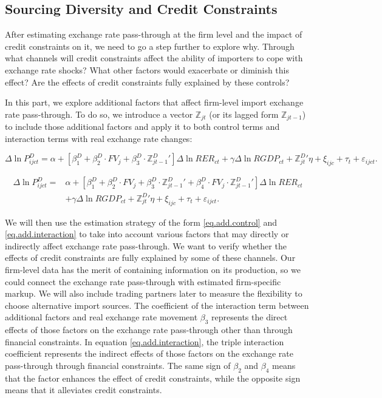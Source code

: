 \documentclass[12pt]{article}
\begin{document}
\subsection{Sourcing Diversity and Credit Constraints}

After estimating exchange rate pass-through at the firm level and the impact of credit constraints on it, we need to go a step further to explore why. Through what channels will credit constraints affect the ability of importers to cope with exchange rate shocks? What other factors would exacerbate or diminish this effect? Are the effects of credit constraints fully explained by these controls?

In this part, we explore additional factors that affect firm-level import exchange rate pass-through. To do so, we introduce a vector $\mathbb{Z}_{jt}$ (or its lagged form $\mathbb{Z}_{jt-1}$) to include those additional factors and apply it to both control terms and interaction terms with real exchange rate changes: 

\begin{equation}
	\Delta \ln P^{D}_{ijct}=\alpha+[\beta^D_{1}+ \beta^D_{2} \cdot FV_{j}+\beta^D_{3} \cdot {\mathbb{Z}^{D}_{jt-1}}'] \Delta \ln RER_{ct} +\gamma \Delta \ln RGDP_{ct}+ {\mathbb{Z}^{D}_{jt}}' \eta+\xi_{ijc}+\tau_{t} +\varepsilon_{ijct}.
	\label{eq.add.control}
\end{equation}

\begin{equation}
	\begin{aligned}
	\Delta \ln P^{D}_{ijct}=&\alpha+[\beta^D_{1}+ \beta^D_{2} \cdot FV_{j}+\beta^D_{3} \cdot {\mathbb{Z}^{D}_{jt-1}}'+\beta^D_{4} \cdot FV_{j} \cdot {\mathbb{Z}^{D}_{jt-1}}'] \Delta \ln RER_{ct} \\ &+\gamma \Delta \ln RGDP_{ct}+ {\mathbb{Z}^{D}_{jt}}' \eta+\xi_{ijc}+\tau_{t} +\varepsilon_{ijct}.
	\end{aligned}	
	\label{eq.add.interaction}
\end{equation}

We will then use the estimation strategy of the form \ref{eq.add.control} and \ref{eq.add.interaction} to take into account various factors that may directly or indirectly affect exchange rate pass-through. We want to verify whether the effects of credit constraints are fully explained by some of these channels. Our firm-level data has the merit of containing information on its production, so we could connect the exchange rate pass-through with estimated firm-specific markup. We will also include trading partners later to measure the flexibility to choose alternative import sources. The coefficient of the interaction term between additional factors and real exchange rate movement $\beta_3$ represents the direct effects of those factors on the exchange rate pass-through other than through financial constraints. In equation \ref{eq.add.interaction}, the triple interaction coefficient represents the indirect effects of those factors on the exchange rate pass-through through financial constraints. The same sign of $\beta_2$ and $\beta_4$ means that the factor enhances the effect of credit constraints, while the opposite sign means that it alleviates credit constraints. 
\end{document}
